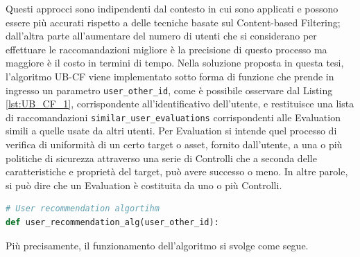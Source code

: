 %
Questi approcci sono indipendenti dal contesto in cui sono applicati e possono essere più accurati rispetto 
a delle tecniche basate sul Content-based Filtering; dall'altra parte all'aumentare del numero di utenti che si considerano per 
effettuare le raccomandazioni migliore è la precisione di questo processo ma maggiore è il costo in termini di tempo.\hfill\break
Nella soluzione proposta in questa tesi, l'algoritmo UB-CF viene implementato sotto forma di funzione che prende in ingresso un parametro 
\texttt{user\_other\_id}, come è possibile osservare dal Listing \ref{lst:UB_CF_1}, corrispondente all'identificativo dell'utente, 
e restituisce una lista di raccomandazioni \texttt{similar\_user\_evaluations} corrispondenti alle Evaluation simili a quelle usate 
da altri utenti.\hfill\break
Per Evaluation si intende quel processo di verifica di uniformità di un certo target o asset, fornito dall'utente, a una o più politiche di sicurezza 
attraverso una serie di Controlli che a seconda delle caratteristiche e proprietà del target, può avere successo o meno. In altre parole, 
si può dire che un Evaluation è costituita da uno o più Controlli.
\lstset{style=python_code_style}
\begin{lstlisting}[language=Python, label=lst:UB_CF_1, caption={\ }]
# User recommendation algortihm
def user_recommendation_alg(user_other_id):
\end{lstlisting}
%
Più precisamente, il funzionamento dell'algoritmo si svolge come segue.
